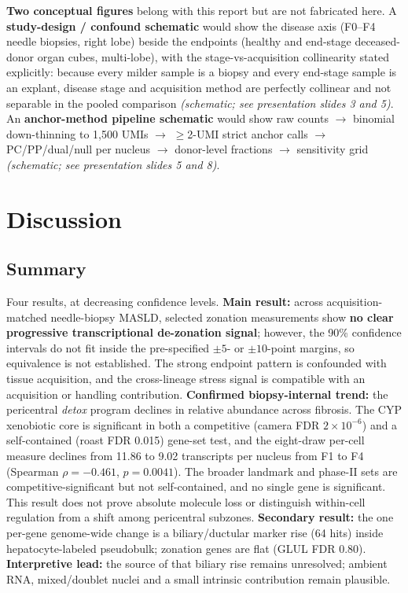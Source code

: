 \documentclass[11pt,a4paper]{article}
\begin{document}
\textbf{Two conceptual figures} belong with this report but are not fabricated here. A \textbf{study-design / confound schematic} would show the disease axis (F0--F4 needle biopsies, right lobe) beside the endpoints (healthy and end-stage deceased-donor organ cubes, multi-lobe), with the stage-vs-acquisition collinearity stated explicitly: because every milder sample is a biopsy and every end-stage sample is an explant, disease stage and acquisition method are perfectly collinear and not separable in the pooled comparison \emph{(schematic; see presentation slides 3 and 5)}. An \textbf{anchor-method pipeline schematic} would show raw counts $\to$ binomial down-thinning to 1{,}500 UMIs $\to$ $\ge$2-UMI strict anchor calls $\to$ PC/PP/dual/null per nucleus $\to$ donor-level fractions $\to$ sensitivity grid \emph{(schematic; see presentation slides 5 and 8)}.

\FloatBarrier
\section{Discussion}

\subsection{Summary}

Four results, at decreasing confidence levels. \textbf{Main result:} across acquisition-matched needle-biopsy MASLD, selected zonation measurements show \textbf{no clear progressive transcriptional de-zonation signal}; however, the 90\% confidence intervals do not fit inside the pre-specified $\pm5$- or $\pm10$-point margins, so equivalence is not established. The strong endpoint pattern is confounded with tissue acquisition, and the cross-lineage stress signal is compatible with an acquisition or handling contribution. \textbf{Confirmed biopsy-internal trend:} the pericentral \emph{detox} program declines in relative abundance across fibrosis. The CYP xenobiotic core is significant in both a competitive (camera FDR $2\times10^{-6}$) and a self-contained (roast FDR 0.015) gene-set test, and the eight-draw per-cell measure declines from 11.86 to 9.02 transcripts per nucleus from F1 to F4 (Spearman $\rho=-0.461$, $p=0.0041$). The broader landmark and phase-II sets are competitive-significant but not self-contained, and no single gene is significant. This result does not prove absolute molecule loss or distinguish within-cell regulation from a shift among pericentral subzones. \textbf{Secondary result:} the one per-gene genome-wide change is a biliary/ductular marker rise (64 hits) inside hepatocyte-labeled pseudobulk; zonation genes are flat (GLUL FDR 0.80). \textbf{Interpretive lead:} the source of that biliary rise remains unresolved; ambient RNA, mixed/doublet nuclei and a small intrinsic contribution remain plausible.
\end{document}
